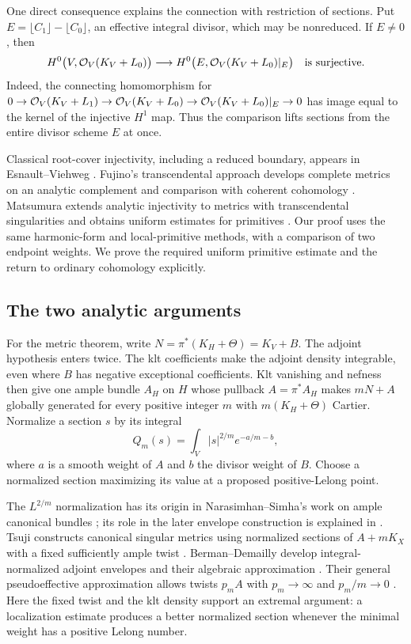 One direct consequence explains the connection with restriction of
sections. Put $E=\lfloor C_1\rfloor-\lfloor C_0\rfloor$, an effective
integral divisor, which may be nonreduced. If $E\ne0$, then
\begin{equation}\label{eq:restriction-surjective}
 H^0\bigl(V,\mathcal O_V(K_V+L_0)\bigr)
 \longrightarrow
 H^0\bigl(E,\mathcal O_V(K_V+L_0)|_E\bigr)
 \quad\text{is surjective}.
\end{equation}
Indeed, the connecting homomorphism for
$0\to\mathcal O_V(K_V+L_1)\to\mathcal O_V(K_V+L_0)
\to\mathcal O_V(K_V+L_0)|_E\to0$ has image equal to the kernel of
the injective $H^1$ map. Thus the comparison lifts sections from the
entire divisor scheme $E$ at once.

Classical root-cover injectivity, including a reduced boundary, appears
in Esnault--Viehweg \cite[Theorem~5.1]{EsnaultViehweg1992}.
Fujino's transcendental approach develops complete metrics on an
analytic complement and comparison with coherent cohomology
\cite[Section~3, Lemmas~3.1--3.2 and Claim~1]{FujinoInjectivity2012}.
Matsumura extends analytic injectivity to metrics with transcendental
singularities and obtains uniform estimates for primitives
\cite[Theorem~1.3 and Sections~5.2--5.3]{Matsumura2018}.
Our proof uses the same harmonic-form and local-primitive methods, with
a comparison of two endpoint weights. We prove the required uniform
primitive estimate and the return to ordinary cohomology explicitly.

\subsection{The two analytic arguments}

For the metric theorem, write $N=\pi^*(K_H+\Theta)=K_V+B$.
The adjoint hypothesis enters twice. The klt coefficients make the
adjoint density integrable, even where $B$ has negative exceptional
coefficients. Klt vanishing and nefness then give one ample bundle
$A_H$ on $H$ whose pullback $A=\pi^*A_H$ makes $mN+A$ globally
generated for every positive integer $m$ with $m(K_H+\Theta)$ Cartier.
Normalize a section $s$ by its integral
\[
 Q_m(s)=\int_V |s|^{2/m}e^{-a/m-b},
\]
where $a$ is a smooth weight of $A$ and $b$ the divisor weight of $B$.
Choose a normalized section maximizing its value at a proposed
positive-Lelong point.

The $L^{2/m}$ normalization has its origin in Narasimhan--Simha's
work on ample canonical bundles \cite{NarasimhanSimha1968}; its role
in the later envelope construction is explained in
\cite[Section~5]{BermanDemailly2012}.
Tsuji constructs canonical singular metrics using normalized sections
of $A+mK_X$ with a fixed sufficiently ample twist
\cite[Sections~1.2 and~2]{Tsuji2007}.
Berman--Demailly develop integral-normalized adjoint envelopes and
their algebraic approximation
\cite[Definition~5.3 and Proposition~5.19]{BermanDemailly2012}.
Their general pseudoeffective approximation allows twists $p_mA$ with
$p_m\to\infty$ and $p_m/m\to0$
\cite[Equation~(5.24)]{BermanDemailly2012}.
Here the fixed twist and the klt density support an extremal argument:
a localization estimate produces a better normalized section whenever
the minimal weight has a positive Lelong number.

